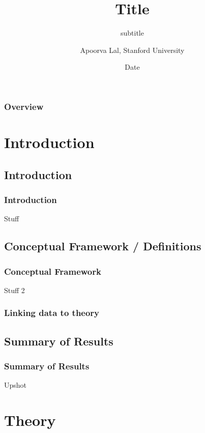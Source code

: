 \documentclass[aspectratio=169]{beamer}
\title{Title}
\subtitle{subtitle}
\author{Apoorva Lal, Stanford University}
\date{Date}
\begin{document}
\frame{\titlepage}
\begin{frame}
\frametitle{Overview}
\tableofcontents
\end{frame}
\section{Introduction}
\tableofcontents[currentsection,subsubsectionstyle=hide]
\subsection{Introduction}
\begin{frame}\frametitle{Introduction}

Stuff

\cite{AngristMostlyharmlesseconometrics2008b}

\end{frame}
\subsection{Conceptual Framework / Definitions}

\begin{frame}[t]\frametitle{Conceptual Framework}

Stuff 2

\end{frame}

\begin{frame}[t]\frametitle{Linking data to theory}



\end{frame}

\subsection{Summary of Results}
\begin{frame}[t]\frametitle{Summary of Results}

Upshot

\end{frame}

\section{Theory}
\tableofcontents[currentsection,subsubsectionstyle=hide]
\end{document}
